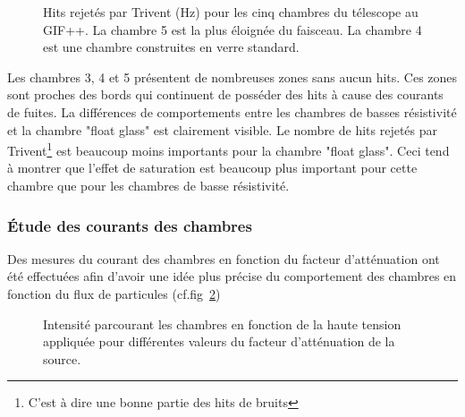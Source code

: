 \begin{figure}[ht!]
	\caption{Hits rejetés par Trivent (\si{\hertz}) pour les cinq chambres du télescope au GIF++. La chambre \num{5} est la plus éloignée du faisceau. La chambre \num{4} est une chambre construites en verre standard.}
	\label{struc}
\end{figure}

Les chambres \num{3}, \num{4} et \num{5} présentent de nombreuses zones sans aucun hits. Ces zones sont proches des bords qui continuent de posséder des hits à cause des courants de fuites. La différences de comportements entre les chambres de basses résistivité et la chambre "float glass" est clairement visible. Le nombre de hits rejetés par Trivent\footnote{C'est à dire une bonne partie des hits de bruits} est beaucoup moins importants pour la chambre "float glass". Ceci tend à montrer que l'effet de saturation est beaucoup plus important pour cette chambre que pour les chambres de basse résistivité.

\subsubsection{Étude des courants des chambres}
Des mesures du courant des chambres en fonction du facteur d'atténuation ont été effectuées afin d'avoir une idée plus précise du comportement des chambres en fonction du flux de particules (cf.fig~\ref{courant})

\begin{figure}[ht!]
	\centering
	\hfill
	\caption{Intensité parcourant les chambres en fonction de la haute tension appliquée pour différentes valeurs du facteur d'atténuation de la source.}
	\label{courant}
\end{figure}


